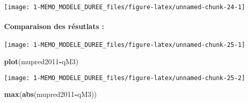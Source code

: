 \documentclass[
]{article}
\newenvironment{Shaded}{\begin{snugshade}}{\end{snugshade}}
\newcommand{\AttributeTok}[1]{\textcolor[rgb]{0.13,0.29,0.53}{#1}}
\newcommand{\CommentTok}[1]{\textcolor[rgb]{0.56,0.35,0.01}{\textit{#1}}}
\newcommand{\DecValTok}[1]{\textcolor[rgb]{0.00,0.00,0.81}{#1}}
\newcommand{\FunctionTok}[1]{\textcolor[rgb]{0.13,0.29,0.53}{\textbf{#1}}}
\newcommand{\NormalTok}[1]{#1}
\newcommand{\OtherTok}[1]{\textcolor[rgb]{0.56,0.35,0.01}{#1}}
\newcommand{\SpecialCharTok}[1]{\textcolor[rgb]{0.81,0.36,0.00}{\textbf{#1}}}
\newcommand{\StringTok}[1]{\textcolor[rgb]{0.31,0.60,0.02}{#1}}
\begin{document}
\begin{center}\texttt{[image: 1-MEMO\_MODELE\_DUREE\_files/figure-latex/unnamed-chunk-24-1]} \end{center}

\hypertarget{comparaison-des-ruxe9sutlats}{%
\paragraph{Comparaison des résutlats
:}\label{comparaison-des-ruxe9sutlats}}

\begin{Shaded}
\end{Shaded}

\begin{center}\texttt{[image: 1-MEMO\_MODELE\_DUREE\_files/figure-latex/unnamed-chunk-25-1]} \end{center}

\begin{Shaded}
\begin{Highlighting}[]
\FunctionTok{plot}\NormalTok{(mupred2011}\SpecialCharTok{{-}}\NormalTok{qM3)}
\end{Highlighting}
\end{Shaded}

\begin{center}\texttt{[image: 1-MEMO\_MODELE\_DUREE\_files/figure-latex/unnamed-chunk-25-2]} \end{center}

\begin{Shaded}
\begin{Highlighting}[]
\FunctionTok{max}\NormalTok{(}\FunctionTok{abs}\NormalTok{(mupred2011}\SpecialCharTok{{-}}\NormalTok{qM3))}
\end{Highlighting}
\end{Shaded}
\end{document}
